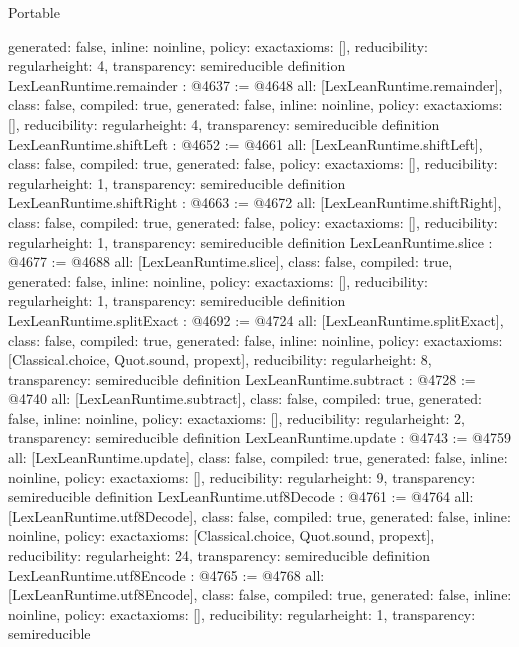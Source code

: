 \begin{lexlean}{Portable}
\begin{coremodule}
{  generated: false,
  inline: noinline,
  policy: exact{axioms: []},
  reducibility: regular{height: 4},
  transparency: semireducible
}
definition LexLeanRuntime.remainder : @4637 := @4648 {
  all: [LexLeanRuntime.remainder],
  class: false,
  compiled: true,
  generated: false,
  inline: noinline,
  policy: exact{axioms: []},
  reducibility: regular{height: 4},
  transparency: semireducible
}
definition LexLeanRuntime.shiftLeft : @4652 := @4661 {
  all: [LexLeanRuntime.shiftLeft],
  class: false,
  compiled: true,
  generated: false,
  policy: exact{axioms: []},
  reducibility: regular{height: 1},
  transparency: semireducible
}
definition LexLeanRuntime.shiftRight : @4663 := @4672 {
  all: [LexLeanRuntime.shiftRight],
  class: false,
  compiled: true,
  generated: false,
  policy: exact{axioms: []},
  reducibility: regular{height: 1},
  transparency: semireducible
}
definition LexLeanRuntime.slice : @4677 := @4688 {
  all: [LexLeanRuntime.slice],
  class: false,
  compiled: true,
  generated: false,
  inline: noinline,
  policy: exact{axioms: []},
  reducibility: regular{height: 1},
  transparency: semireducible
}
definition LexLeanRuntime.splitExact : @4692 := @4724 {
  all: [LexLeanRuntime.splitExact],
  class: false,
  compiled: true,
  generated: false,
  inline: noinline,
  policy: exact{axioms: [Classical.choice, Quot.sound, propext]},
  reducibility: regular{height: 8},
  transparency: semireducible
}
definition LexLeanRuntime.subtract : @4728 := @4740 {
  all: [LexLeanRuntime.subtract],
  class: false,
  compiled: true,
  generated: false,
  inline: noinline,
  policy: exact{axioms: []},
  reducibility: regular{height: 2},
  transparency: semireducible
}
definition LexLeanRuntime.update : @4743 := @4759 {
  all: [LexLeanRuntime.update],
  class: false,
  compiled: true,
  generated: false,
  inline: noinline,
  policy: exact{axioms: []},
  reducibility: regular{height: 9},
  transparency: semireducible
}
definition LexLeanRuntime.utf8Decode : @4761 := @4764 {
  all: [LexLeanRuntime.utf8Decode],
  class: false,
  compiled: true,
  generated: false,
  inline: noinline,
  policy: exact{axioms: [Classical.choice, Quot.sound, propext]},
  reducibility: regular{height: 24},
  transparency: semireducible
}
definition LexLeanRuntime.utf8Encode : @4765 := @4768 {
  all: [LexLeanRuntime.utf8Encode],
  class: false,
  compiled: true,
  generated: false,
  inline: noinline,
  policy: exact{axioms: []},
  reducibility: regular{height: 1},
  transparency: semireducible
}


\end{coremodule}
\end{lexlean}

